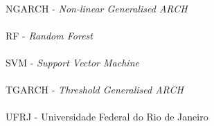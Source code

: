 \paragraph{}NGARCH - \textit{Non-linear Generalised ARCH}
\paragraph{}RF - \textit{Random Forest}
\paragraph{}SVM - \textit{Support Vector Machine}
\paragraph{}TGARCH - \textit{Threshold Generalised ARCH}
\paragraph{}UFRJ - Universidade Federal do Rio de Janeiro

\pagebreak